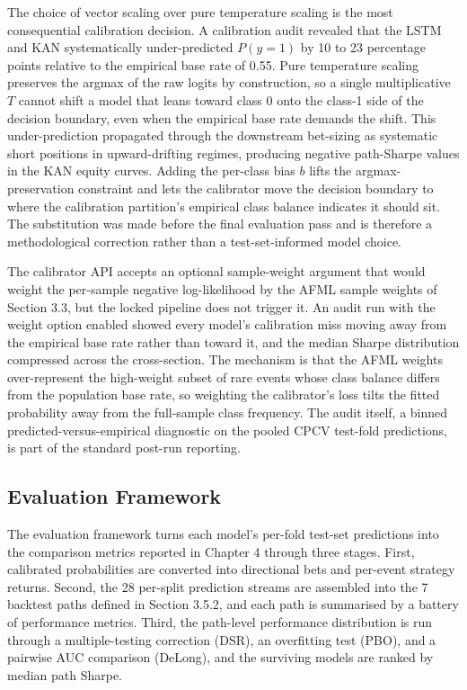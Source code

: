 \documentclass[12pt,a4paper,oneside]{article}
\begin{document}
The choice of vector scaling over pure temperature scaling is the most consequential calibration decision. A calibration audit revealed that the LSTM and KAN systematically under-predicted $P(y = 1)$ by 10 to 23 percentage points relative to the empirical base rate of 0.55. Pure temperature scaling preserves the argmax of the raw logits by construction, so a single multiplicative $T$ cannot shift a model that leans toward class 0 onto the class-1 side of the decision boundary, even when the empirical base rate demands the shift. This under-prediction propagated through the downstream bet-sizing as systematic short positions in upward-drifting regimes, producing negative path-Sharpe values in the KAN equity curves. Adding the per-class bias $b$ lifts the argmax-preservation constraint and lets the calibrator move the decision boundary to where the calibration partition's empirical class balance indicates it should sit. The substitution was made before the final evaluation pass and is therefore a methodological correction rather than a test-set-informed model choice.

The calibrator API accepts an optional sample-weight argument that would weight the per-sample negative log-likelihood by the AFML sample weights of Section 3.3, but the locked pipeline does not trigger it. An audit run with the weight option enabled showed every model's calibration miss moving away from the empirical base rate rather than toward it, and the median Sharpe distribution compressed across the cross-section. The mechanism is that the AFML weights over-represent the high-weight subset of rare events whose class balance differs from the population base rate, so weighting the calibrator's loss tilts the fitted probability away from the full-sample class frequency. The audit itself, a binned predicted-versus-empirical diagnostic on the pooled CPCV test-fold predictions, is part of the standard post-run reporting.


\subsection{Evaluation Framework}\label{subsec:evaluation}

The evaluation framework turns each model's per-fold test-set predictions into the comparison metrics reported in Chapter 4 through three stages. First, calibrated probabilities are converted into directional bets and per-event strategy returns. Second, the 28 per-split prediction streams are assembled into the 7 backtest paths defined in Section 3.5.2, and each path is summarised by a battery of performance metrics. Third, the path-level performance distribution is run through a multiple-testing correction (DSR), an overfitting test (PBO), and a pairwise AUC comparison (DeLong), and the surviving models are ranked by median path Sharpe.
\end{document}
